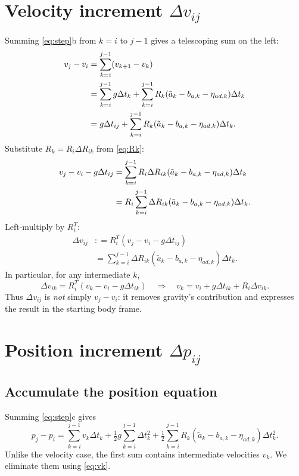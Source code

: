 \documentclass[11pt,a4paper]{article}
\newcommand{\defeq}{\mathrel{\mathop:}=}
\begin{document}
\section{Velocity increment $\Delta v_{ij}$}
Summing \eqref{eq:step}b from $k=i$ to $j-1$ gives a telescoping sum on the left:
\begin{align}
v_j-v_i
&=\sum_{k=i}^{j-1}(v_{k+1}-v_k)\notag\\
&=\sum_{k=i}^{j-1}g\Delta t_k+\sum_{k=i}^{j-1}R_k(\tilde a_k-b_{a,k}-\eta_{ad,k})\Delta t_k\notag\\
&=g\Delta t_{ij}+\sum_{k=i}^{j-1}R_k(\tilde a_k-b_{a,k}-\eta_{ad,k})\Delta t_k.
\end{align}
Substitute $R_k=R_i\Delta R_{ik}$ from \eqref{eq:Rk}:
\begin{align}
v_j-v_i-g\Delta t_{ij}
&=\sum_{k=i}^{j-1}R_i\Delta R_{ik}(\tilde a_k-b_{a,k}-\eta_{ad,k})\Delta t_k\notag\\
&=R_i\sum_{k=i}^{j-1}\Delta R_{ik}(\tilde a_k-b_{a,k}-\eta_{ad,k})\Delta t_k.
\end{align}
Left-multiply by $R_i^T$:
\begin{equation}\label{eq:dv}
\boxed{\begin{aligned}
\Delta v_{ij}&\defeq R_i^T(v_j-v_i-g\Delta t_{ij})\\
&=\sum_{k=i}^{j-1}\Delta R_{ik}(\tilde a_k-b_{a,k}-\eta_{ad,k})\Delta t_k.
\end{aligned}}
\end{equation}
In particular, for any intermediate $k$,
\begin{equation}\label{eq:vk}
\Delta v_{ik}=R_i^T(v_k-v_i-g\Delta t_{ik})
\quad\Longrightarrow\quad
v_k=v_i+g\Delta t_{ik}+R_i\Delta v_{ik}.
\end{equation}
Thus $\Delta v_{ij}$ is \emph{not} simply $v_j-v_i$: it removes gravity's contribution and expresses the result in the starting body frame.

\section{Position increment $\Delta p_{ij}$}
\subsection{Accumulate the position equation}
Summing \eqref{eq:step}c gives
\begin{equation}\label{eq:pacc}
p_j-p_i
=\sum_{k=i}^{j-1}v_k\Delta t_k
+\tfrac12g\sum_{k=i}^{j-1}\Delta t_k^2
+\tfrac12\sum_{k=i}^{j-1}R_k(\tilde a_k-b_{a,k}-\eta_{ad,k})\Delta t_k^2.
\end{equation}
Unlike the velocity case, the first sum contains intermediate velocities $v_k$. We eliminate them using \eqref{eq:vk}.
\end{document}

